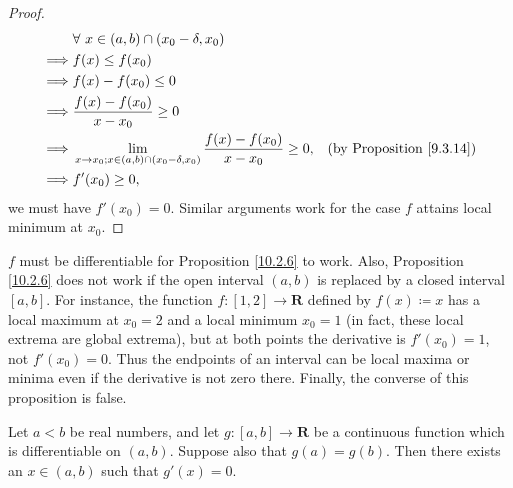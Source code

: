 \begin{proof}
\begin{align*}
                 & \forall\ x \in (a, b) \cap (x_0 - \delta, x_0)                                                                                        \\
        \implies & f(x) \leq f(x_0)                                                                                                                      \\
        \implies & f(x) - f(x_0) \leq 0                                                                                                                  \\
        \implies & \frac{f(x) - f(x_0)}{x - x_0} \geq 0                                                                                                  \\
        \implies & \lim_{x \to x_0 ; x \in (a, b) \cap (x_0 - \delta, x_0)} \frac{f(x) - f(x_0)}{x - x_0} \geq 0, & \text{(by Proposition \ref{9.3.14})} \\
        \implies & f'(x_0) \geq 0,
    \end{align*}
    we must have \(f'(x_0) = 0\).
    Similar arguments work for the case \(f\) attains local minimum at \(x_0\).
\end{proof}

\begin{note}
    \(f\) must be differentiable for Proposition \ref{10.2.6} to work.
    Also, Proposition \ref{10.2.6} does not work if the open interval \((a, b)\) is replaced by a closed interval \([a, b]\).
    For instance, the function \(f : [1, 2] \to \mathbf{R}\) defined by \(f(x) \coloneqq x\) has a local maximum at \(x_0 = 2\) and a local minimum \(x_0 = 1\) (in fact, these local extrema are global extrema), but at both points the derivative is \(f'(x_0) = 1\), not \(f'(x_0) = 0\).
    Thus the endpoints of an interval can be local maxima or minima even if the derivative is not zero there.
    Finally, the converse of this proposition is false.
\end{note}

\begin{theorem}\label{10.2.7}
    Let \(a < b\) be real numbers, and let \(g : [a, b] \to \mathbf{R}\) be a continuous function which is differentiable on \((a, b)\).
    Suppose also that \(g(a) = g(b)\).
    Then there exists an \(x \in (a, b)\) such that \(g'(x) = 0\).
\end{theorem}

